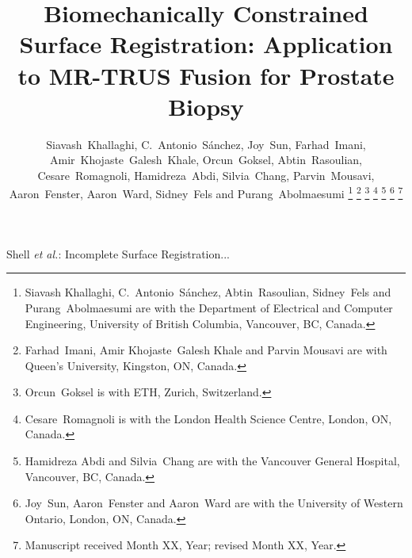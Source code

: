 \documentclass[journal]{IEEEtran}
\begin{document}
\title{Biomechanically Constrained Surface Registration: Application to MR-TRUS Fusion for Prostate Biopsy}

\author{Siavash~Khallaghi, C.~Antonio~S\'anchez, Joy~Sun, Farhad~Imani, Amir~Khojaste~Galesh~Khale, Orcun~Goksel, Abtin~Rasoulian, Cesare~Romagnoli, Hamidreza~Abdi, Silvia~Chang, Parvin~Mousavi, Aaron~Fenster, Aaron~Ward, Sidney~Fels and Purang~Abolmaesumi%
\thanks{Siavash Khallaghi, C.~Antonio~S\'anchez, Abtin~Rasoulian, Sidney~Fels and Purang~Abolmaesumi are with the Department of Electrical and Computer Engineering, University of British Columbia, Vancouver, BC, Canada.}%
\thanks{Farhad~Imani, Amir Khojaste~Galesh Khale and Parvin Mousavi are with Queen's University, Kingston, ON, Canada.}
\thanks{Orcun~Goksel is with ETH, Zurich, Switzerland.}
\thanks{Cesare~Romagnoli is with the London Health Science Centre, London, ON, Canada.}%
\thanks{Hamidreza Abdi and Silvia~Chang are with the Vancouver General Hospital, Vancouver, BC, Canada.}%
\thanks{Joy~Sun, Aaron~Fenster and Aaron~Ward are with the University of Western Ontario, London, ON, Canada.}%
\thanks{Manuscript received Month XX, Year; revised Month XX, Year.}}

%
{Shell \MakeLowercase{\textit{et al.}}: Incomplete Surface Registration...}

\maketitle
\end{document}
